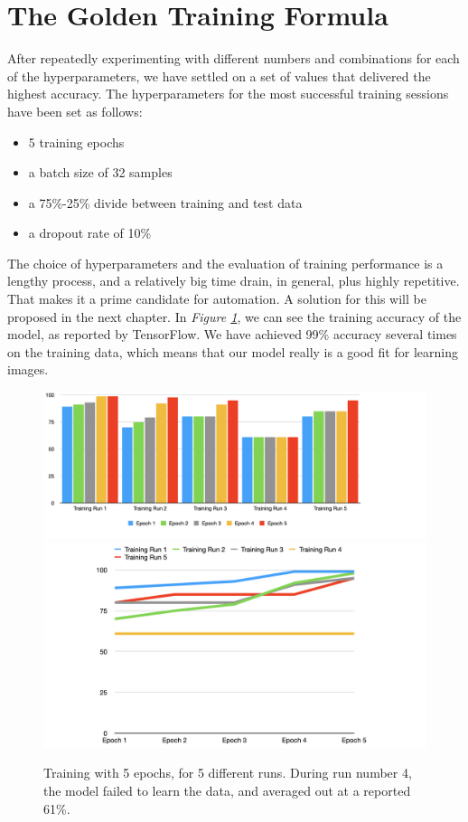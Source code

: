 \section{The Golden Training Formula}
After repeatedly experimenting with different numbers and combinations for each of the hyperparameters, we have settled on a set of values that delivered the highest accuracy. The hyperparameters for the most successful training sessions have been set as follows: 
\begin{itemize}
    \item 5 training epochs
    \item a batch size of 32 samples
    \item a 75\%-25\% divide between training and test data
    \item a dropout rate of 10\%
\end{itemize}
The choice of hyperparameters and the evaluation of training performance is a lengthy process, and a relatively big time drain, in general, plus highly repetitive. That makes it a prime candidate for automation. A solution for this will be proposed in the next chapter. In \textit{Figure \ref{training_tf_gold}}, we can see the training accuracy of the model, as reported by TensorFlow. We have achieved 99\% accuracy several times on the training data, which means that our model really is a good fit for learning images. 

\begin{figure}
    \centering
    \includegraphics[width = 16 cm]{figures/training_fig1}
    \includegraphics[width = 16 cm]{figures/training_fig2}
    \caption{Training with 5 epochs, for 5 different runs. During run number 4, the model failed to learn the data, and averaged out at a reported 61\%.}
    \label{training_tf_gold}
\end{figure}

